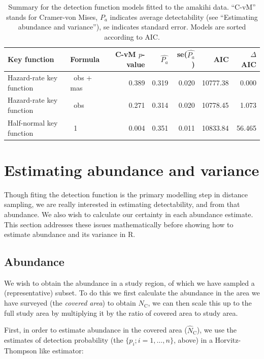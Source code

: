 \documentclass[article]{jss}
\begin{document}
\begin{table}

\caption{Summary for the detection function models fitted to the amakihi data. ``C-vM'' stands for Cramer-von Mises, $P_a$ indicates average detectability (see ``Estimating abundance and variance''), se indicates standard error. Models are sorted according to AIC.\label{tab:amakihi}}
\begin{tabular}{llrrrrr}
\toprule
Key function & Formula & C-vM $p$-value & $\hat{P_a}$ & se($\hat{P_a}$) & AIC & $\Delta$AIC\\
\midrule
Hazard-rate key function & ~obs + mas & 0.389 & 0.319 & 0.020 & 10777.38 & 0.000\\
Hazard-rate key function & ~obs & 0.271 & 0.314 & 0.020 & 10778.45 & 1.073\\
Half-normal key function & ~1 & 0.004 & 0.351 & 0.011 & 10833.84 & 56.465\\
\bottomrule
\end{tabular}
\end{table}

\section{Estimating abundance and
variance}\label{estimating-abundance-and-variance}

Though fiting the detection function is the primary modelling step in
distance sampling, we are really interested in estimating detectability,
and from that abundance. We also wish to calculate our certainty in each
abundance estimate. This section addresses these issues mathematically
before showing how to estimate abundance and its variance in R.

\subsection{Abundance}\label{abundance}

We wish to obtain the abundance in a study region, of which we have
sampled a (representative) subset. To do this we first calculate the
abundance in the area we have surveyed (the \emph{covered area}) to
obtain \(\hat{N}_\text{C}\), we can then scale this up to the full study
area by multiplying it by the ratio of covered area to study area.

First, in order to estimate abundance in the covered area
(\(\hat{N}_\text{C}\)), we use the estimates of detection probability
(the \(\{p_i; i=1,\ldots,n\}\), above) in a Horvitz-Thompson like
estimator:
\end{document}
